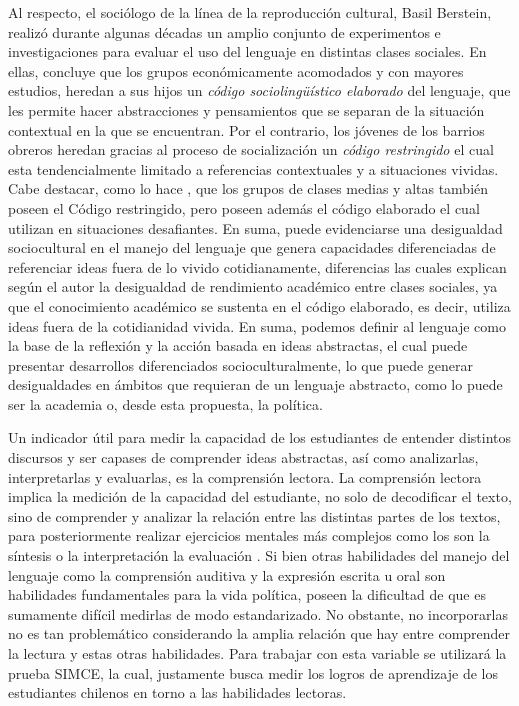 \documentclass[12pt,twoside]{templates/facsothesis}
\begin{document}
Al respecto, el sociólogo de la línea de la reproducción cultural, Basil Berstein, realizó durante algunas décadas un amplio conjunto de experimentos e investigaciones para evaluar el uso del lenguaje en distintas clases sociales. En ellas, \citet{bernstein_CLASES_1985} concluye que los grupos económicamente acomodados y con mayores estudios, heredan a sus hijos un \emph{código sociolingüístico elaborado} del lenguaje, que les permite hacer abstracciones y pensamientos que se separan de la situación contextual en la que se encuentran. Por el contrario, los jóvenes de los barrios obreros heredan gracias al proceso de socialización un \emph{código restringido} el cual esta tendencialmente limitado a referencias contextuales y a situaciones vividas. Cabe destacar, como lo hace \citet{bernstein_Poder_1988}, que los grupos de clases medias y altas también poseen el Código restringido, pero poseen además el código elaborado el cual utilizan en situaciones desafiantes. En suma, puede evidenciarse una desigualdad sociocultural en el manejo del lenguaje que genera capacidades diferenciadas de referenciar ideas fuera de lo vivido cotidianamente, diferencias las cuales explican según el autor la desigualdad de rendimiento académico entre clases sociales, ya que el conocimiento académico se sustenta en el código elaborado, es decir, utiliza ideas fuera de la cotidianidad vivida. En suma, podemos definir al lenguaje como la base de la reflexión y la acción basada en ideas abstractas, el cual puede presentar desarrollos diferenciados socioculturalmente, lo que puede generar desigualdades en ámbitos que requieran de un lenguaje abstracto, como lo puede ser la academia o, desde esta propuesta, la política.

Un indicador útil para medir la capacidad de los estudiantes de entender distintos discursos y ser capases de comprender ideas abstractas, así como analizarlas, interpretarlas y evaluarlas, es la comprensión lectora. La comprensión lectora implica la medición de la capacidad del estudiante, no solo de decodificar el texto, sino de comprender y analizar la relación entre las distintas partes de los textos, para posteriormente realizar ejercicios mentales más complejos como los son la síntesis o la interpretación la evaluación \citep{ace_Informe_2018}. Si bien otras habilidades del manejo del lenguaje como la comprensión auditiva y la expresión escrita u oral son habilidades fundamentales para la vida política, poseen la dificultad de que es sumamente difícil medirlas de modo estandarizado. No obstante, no incorporarlas no es tan problemático considerando la amplia relación que hay entre comprender la lectura y estas otras habilidades. Para trabajar con esta variable se utilizará la prueba SIMCE, la cual, justamente busca medir los logros de aprendizaje de los estudiantes chilenos en torno a las habilidades lectoras.
\end{document}

